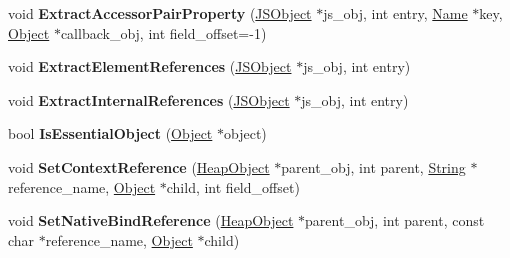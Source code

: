 \begin{DoxyCompactItemize}
\item 
void {\bfseries Extract\+Accessor\+Pair\+Property} (\hyperlink{classv8_1_1internal_1_1_j_s_object}{J\+S\+Object} $\ast$js\+\_\+obj, int entry, \hyperlink{classv8_1_1internal_1_1_name}{Name} $\ast$key, \hyperlink{classv8_1_1internal_1_1_object}{Object} $\ast$callback\+\_\+obj, int field\+\_\+offset=-\/1)\hypertarget{classv8_1_1internal_1_1_v8_heap_explorer_a434e2e71c0882979164d6539917af9af}{}\label{classv8_1_1internal_1_1_v8_heap_explorer_a434e2e71c0882979164d6539917af9af}

\item 
void {\bfseries Extract\+Element\+References} (\hyperlink{classv8_1_1internal_1_1_j_s_object}{J\+S\+Object} $\ast$js\+\_\+obj, int entry)\hypertarget{classv8_1_1internal_1_1_v8_heap_explorer_aa56cb7e0a457d2fa84d47cd092767098}{}\label{classv8_1_1internal_1_1_v8_heap_explorer_aa56cb7e0a457d2fa84d47cd092767098}

\item 
void {\bfseries Extract\+Internal\+References} (\hyperlink{classv8_1_1internal_1_1_j_s_object}{J\+S\+Object} $\ast$js\+\_\+obj, int entry)\hypertarget{classv8_1_1internal_1_1_v8_heap_explorer_aab9d0dcda9b9ae662ce053512f9f5ce5}{}\label{classv8_1_1internal_1_1_v8_heap_explorer_aab9d0dcda9b9ae662ce053512f9f5ce5}

\item 
bool {\bfseries Is\+Essential\+Object} (\hyperlink{classv8_1_1internal_1_1_object}{Object} $\ast$object)\hypertarget{classv8_1_1internal_1_1_v8_heap_explorer_aecfa0b2cc58a831ec6b661bb01388abd}{}\label{classv8_1_1internal_1_1_v8_heap_explorer_aecfa0b2cc58a831ec6b661bb01388abd}

\item 
void {\bfseries Set\+Context\+Reference} (\hyperlink{classv8_1_1internal_1_1_heap_object}{Heap\+Object} $\ast$parent\+\_\+obj, int parent, \hyperlink{classv8_1_1internal_1_1_string}{String} $\ast$reference\+\_\+name, \hyperlink{classv8_1_1internal_1_1_object}{Object} $\ast$child, int field\+\_\+offset)\hypertarget{classv8_1_1internal_1_1_v8_heap_explorer_a08bbf58bc9fa46f6ae7f3c1c6190faa5}{}\label{classv8_1_1internal_1_1_v8_heap_explorer_a08bbf58bc9fa46f6ae7f3c1c6190faa5}

\item 
void {\bfseries Set\+Native\+Bind\+Reference} (\hyperlink{classv8_1_1internal_1_1_heap_object}{Heap\+Object} $\ast$parent\+\_\+obj, int parent, const char $\ast$reference\+\_\+name, \hyperlink{classv8_1_1internal_1_1_object}{Object} $\ast$child)\hypertarget{classv8_1_1internal_1_1_v8_heap_explorer_a252dc1519d0923a6b3b121b3e2df41f7}{}\label{classv8_1_1internal_1_1_v8_heap_explorer_a252dc1519d0923a6b3b121b3e2df41f7}


\end{DoxyCompactItemize}

